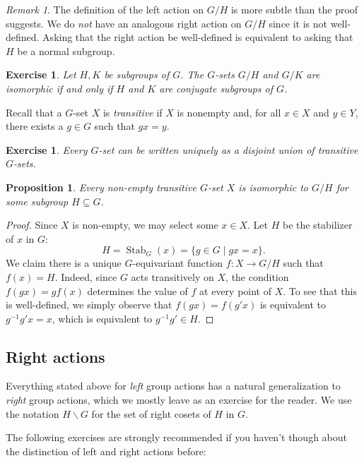 \documentclass[12pt]{article}
\theoremstyle{plain}
\newtheorem{proposition}[theorem]{Proposition}
\newtheorem{exercise}[theorem]{Exercise}
\theoremstyle{definition}
\theoremstyle{remark}
\newtheorem{remark}[theorem]{Remark}
\numberwithin{equation}{section}
\begin{document}
\begin{remark}
The definition of the left action on $G/H$ is more subtle than the proof
suggests.  We do \emph{not} have an analogous right action on $G/H$
since it is not well-defined.  Asking that the right action be
well-defined is equivalent to asking that $H$ be a normal subgroup.
\end{remark}

\begin{exercise}
Let $H,K$ be subgroups of $G$.
The $G$-sets $G/H$ and $G/K$ are isomorphic if and only if
$H$ and $K$ are conjugate subgroups of $G$.
\end{exercise}

Recall that a $G$-set $X$ is \emph{transitive} if $X$ is nonempty
and, for all $x \in X$ and
$y \in Y$, there exists a $g \in G$ such that $gx=y$.

\begin{exercise}
Every $G$-set can be written uniquely as a disjoint union of
transitive $G$-sets.
\end{exercise}

\begin{proposition}
Every non-empty transitive $G$-set $X$ is isomorphic to $G/H$
for some subgroup $H \subseteq G$.
\end{proposition}

\begin{proof}
Since $X$ is non-empty, we may select some $x \in X$.
Let $H$ be the stabilizer of $x$ in $G$:
\[
H = \operatorname{Stab}_G(x) = \{ g \in G \mid gx=x \}.
\]
We claim there is a unique $G$-equivariant function
$f : X \to G/H$ such that $f(x)=H$.
Indeed, since $G$ acts transitively on $X$,
the condition $f(gx)=gf(x)$ determines the value of $f$ at every point
of $X$.  To see that this is well-defined, we simply observe that
$f(gx)=f(g'x)$ is equivalent to $g^{-1}g'x=x$, which is equivalent to
$g^{-1}g' \in H$.
\end{proof}

\subsection{Right actions}

Everything stated above for \emph{left} group actions has a natural
generalization to \emph{right} group actions, which we mostly leave as
an exercise for the reader.
We use the notation $H \backslash G$ for the set of right cosets of $H$
in $G$.

The following exercises are strongly recommended if you haven't
though about the distinction of left and right actions before:
\end{document}
